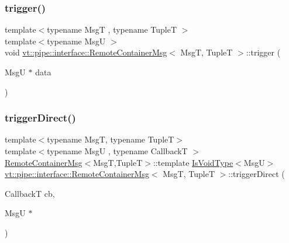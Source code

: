 \mbox{\label{structvt_1_1pipe_1_1interface_1_1_remote_container_msg_a7710e198b9f5482c6239cc9c470c5bcd}} 
\subsubsection{\texorpdfstring{trigger()}{trigger()}}
{\footnotesize\ttfamily template$<$typename MsgT , typename TupleT $>$ \\
template$<$typename MsgU $>$ \\
void \hyperlink{structvt_1_1pipe_1_1interface_1_1_remote_container_msg}{vt\+::pipe\+::interface\+::\+Remote\+Container\+Msg}$<$ MsgT, TupleT $>$\+::trigger (\begin{DoxyParamCaption}\item[{MsgU $\ast$}]{data }\end{DoxyParamCaption})}

\mbox{\label{structvt_1_1pipe_1_1interface_1_1_remote_container_msg_a5875d056f5e8a41ea1c69f173ae9dfa7}} 
\subsubsection{\texorpdfstring{trigger\+Direct()}{triggerDirect()}\hspace{0.1cm}{\footnotesize\ttfamily [1/2]}}
{\footnotesize\ttfamily template$<$typename MsgT, typename TupleT$>$ \\
template$<$typename MsgU , typename CallbackT $>$ \\
\hyperlink{structvt_1_1pipe_1_1interface_1_1_remote_container_msg}{Remote\+Container\+Msg}$<$MsgT,TupleT$>$\+::template \hyperlink{structvt_1_1pipe_1_1interface_1_1_remote_container_msg_af3f6ea130372986d8d0b4c39f35f59b6}{Is\+Void\+Type}$<$MsgU$>$ \hyperlink{structvt_1_1pipe_1_1interface_1_1_remote_container_msg}{vt\+::pipe\+::interface\+::\+Remote\+Container\+Msg}$<$ MsgT, TupleT $>$\+::trigger\+Direct (\begin{DoxyParamCaption}\item[{CallbackT}]{cb,  }\item[{MsgU $\ast$}]{ }\end{DoxyParamCaption})}

